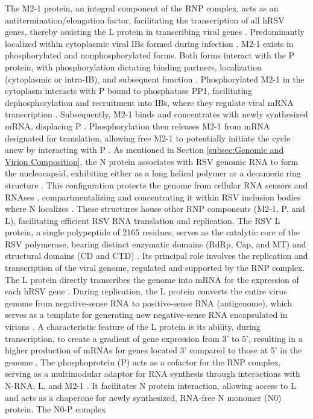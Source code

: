 The M2-1 protein, an integral component of the RNP complex, acts as an antitermination/elongation factor, facilitating the transcription of all hRSV genes, thereby assisting the L protein in transcribing viral genes \cite{Collins1996TranscriptionVirus., Noton2015InitiationReplication}. Predominantly localized within cytoplasmic viral IBs formed during infection \cite{Rincheval2017FunctionalVirus}, M2-1 exists in phosphorylated and nonphosphorylated forms. Both forms interact with the P protein, with phosphorylation dictating binding partners, localization (cytoplasmic or intra-IB), and subsequent function \cite{Richard2018RSVTranscription}. Phosphorylated M2-1 in the cytoplasm interacts with P bound to phosphatase PP1, facilitating dephosphorylation and recruitment into IBs, where they regulate viral mRNA transcription \cite{Richard2018RSVTranscription}. Subsequently, M2-1 binds and concentrates with newly synthesized mRNA, displacing P \cite{Blondot2012StructureProtein.}. Phosphorylation then releases M2-1 from mRNA designated for translation, allowing free M2-1 to potentially initiate the cycle anew by interacting with P \cite{Richard2018RSVTranscription}. As mentioned in Section \ref{subsec:Genomic and Virion Composition}, the N protein associates with RSV genomic RNA to form the nucleocapsid, exhibiting either as a long helical polymer or a decameric ring structure \cite{Gonnin2023StructuralNucleocapsids}. This configuration protects the genome from cellular RNA sensors and RNAses \cite{Tawar2009CrystalVirus}, compartmentalizing and concentrating it within RSV inclusion bodies where N localizes \cite{Rincheval2017FunctionalVirus}. These structures house other RNP components (M2-1, P, and L), facilitating efficient RSV RNA translation and replication. The RSV L protein, a single polypeptide of 2165 residues, serves as the catalytic core of the RSV polymerase, bearing distinct enzymatic domains (RdRp, Cap, and MT) and structural domains (CD and CTD) \cite{Gilman2019StructureComplex, Cao2020Cryo-EMPolymerase}. Its principal role involves the replication and transcription of the viral genome, regulated and supported by the RNP complex. The L protein directly transcribes the genome into mRNA for the expression of each hRSV gene \cite{Cowton2006UnravellingSynthesis, Noton2015InitiationReplication}. During replication, the L protein converts the entire virus genome from negative-sense RNA to positive-sense RNA (antigenome), which serves as a template for generating new negative-sense RNA encapsulated in virions \cite{Cowton2006UnravellingSynthesis, Fearns2000FunctionalVirus}. A characteristic feature of the L protein is its ability, during transcription, to create a gradient of gene expression from 3' to 5', resulting in a higher production of mRNAs for genes located 3' compared to those at 5' in the genome \cite{Hardy1998TheTranscription, Kuo1996TheMinigenome}. The phosphoprotein (P) acts as a cofactor for the RNP complex, serving as a multimodular adaptor for RNA synthesis through interactions with N-RNA, L, and M2-1 \cite{Blondot2012StructureProtein., Cardone2021APhosphoprotein}. It facilitates N protein interaction, allowing access to L \cite{Sourimant2015FinePhosphoprotein} and acts as a chaperone for newly synthesized, RNA-free N monomer (N0) protein. The N0-P complex 